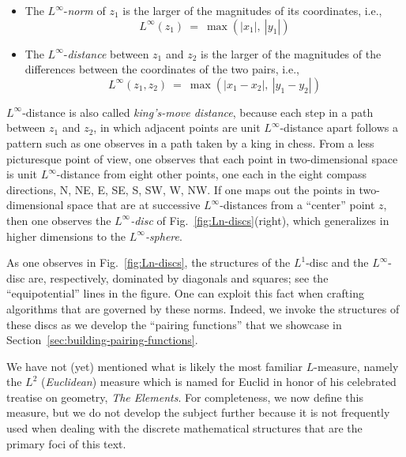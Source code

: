 \begin{itemize}
\item
The $L^\infty$-{\it norm} of $z_1$ is the larger of the magnitudes of its coordinates, i.e.,
\[ L^\infty(z_1) \ = \ \max(|x_1|, \ |y_1|)  \]  

\medskip\item
The $L^\infty$-{\it distance} between $z_1$ and $z_2$ is the larger of the magnitudes of the
differences between the coordinates of the two pairs, i.e.,
\[ L^\infty(z_1, z_2) \ = \ \max(|x_1 - x_2|, \  |y_1 - y_2|) \]
\end{itemize}
$L^\infty$-distance is also called {\it king's-move distance}, because each step in a path between $z_1$ and $z_2$, in which adjacent points are unit $L^\infty$-distance apart follows a pattern such as one observes in a path taken by a king in chess.  From a less picturesque point of view, one observes that each point in two-dimensional space is unit $L^\infty$-distance from eight other points, one each in the eight compass directions, N, NE, E, SE, S, SW, W, NW.  If one maps out the points in two-dimensional space that are at successive $L^\infty$-distances from a ``center'' point $z$, then one observes the {\it $L^\infty$-disc} of Fig.~\ref{fig:Ln-discs}(right), which generalizes in higher dimensions to the {\it $L^\infty$-sphere}.
  

\smallskip

As one observes in Fig.~\ref{fig:Ln-discs}, the structures of the $L^1$-disc and the $L^\infty$-disc are, respectively, dominated by diagonals and squares; see the ``equipotential'' lines in the figure.  One can exploit this fact when crafting algorithms that are governed by these norms.  Indeed, we invoke the structures of these discs as we develop the ``pairing functions'' that we showcase in Section~\ref{sec:building-pairing-functions}.

\bigskip

 
 

We have not (yet) mentioned what is likely the most familiar $L$-measure, namely the $L^2$ ({\em Euclidean}) measure which is named for Euclid in honor of his celebrated treatise on geometry, {\it The Elements}.  For completeness, we now define this measure, but we do not develop the subject further because it is not frequently used when dealing with the discrete mathematical structures
that are the primary foci of this text.

